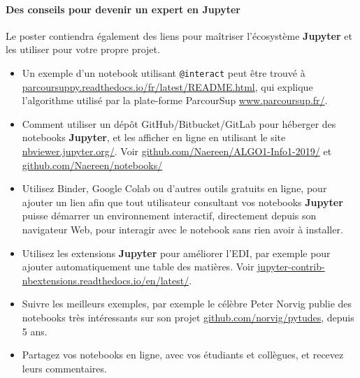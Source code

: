 \documentclass[runningheads]{llncs}
\newcommand{\Jupyter}{\textbf{Jupyter}}
\begin{document}





\paragraph{Des conseils pour devenir un expert en \Jupyter}

Le poster contiendra également des liens pour maîtriser l'écosystème \Jupyter{} et les utiliser pour votre propre projet.

\begin{itemize}
    \item Un exemple d'un notebook utilisant \texttt{@interact} peut être trouvé à \url{parcoursuppy.readthedocs.io/fr/latest/README.html}, qui explique l'algorithme utilisé par la plate-forme ParcourSup \url{www.parcoursup.fr/}.
    \item Comment utiliser un dépôt GitHub/Bitbucket/GitLab pour héberger des notebooks \Jupyter{}, et les afficher en ligne en utilisant le site \url{nbviewer.jupyter.org/}.
    Voir \url{github.com/Naereen/ALGO1-Info1-2019/} et \url{github.com/Naereen/notebooks/}
    \item Utilisez Binder, Google Colab ou d'autres outils gratuits en ligne, pour ajouter un lien afin que tout utilisateur consultant vos notebooks \Jupyter{} puisse démarrer un environnement interactif, directement depuis son navigateur Web, pour interagir avec le notebook sans rien avoir à installer.
    \item Utilisez les extensions \Jupyter{} pour améliorer l'EDI, par exemple pour ajouter automatiquement une table des matières. Voir \url{jupyter-contrib-nbextensions.readthedocs.io/en/latest/}.
    \item Suivre les meilleurs exemples, par exemple le célèbre Peter Norvig publie des notebooks très intéressants sur son projet \url{github.com/norvig/pytudes}, depuis 5 ans.
    \item Partagez vos notebooks en ligne, avec vos étudiants et collègues, et recevez leurs commentaires.
\end{itemize}
\end{document}
